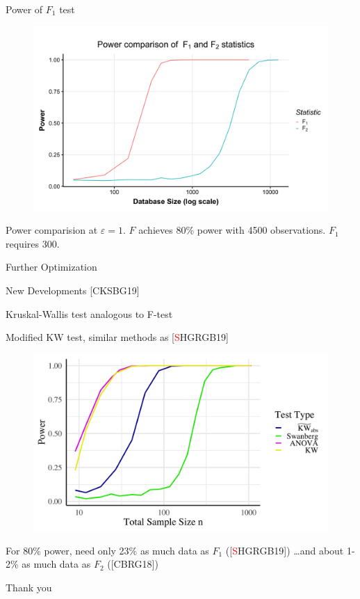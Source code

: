 \documentclass{beamer}
\begin{document}
\begin{frame}{Power of $F_1$ test}
  \begin{figure}
  \includegraphics[scale=0.1]{images/f1-vs-f2}
  \end{figure}
  Power comparision at $\varepsilon=1$.  $F$ achieves 80\% power with 4500 observations.  $F_1$ requires 300.
\end{frame}


\begin{frame}{Further Optimization}
\end{frame}

\begin{frame}{New Developments [CKSBG19]}

Kruskal-Wallis test analogous to F-test \pause
\bigskip 

Modified KW test, similar methods as [\textcolor{red}{S}HGRGB19] \pause

\begin{figure}
  \includegraphics[scale=0.075]{images/anova_comp}
  \end{figure}
  
  For 80\% power, need only 23\% as much data as $F_1$ ([\textcolor{red}{S}HGRGB19]) \ldots \pause and about 1-2\% as much data as $F_2$ ([CBRG18])
\end{frame}

\begin{frame}{}
    \begin{center}
        \Huge Thank you
    \end{center}    
\end{frame}
\end{document}
